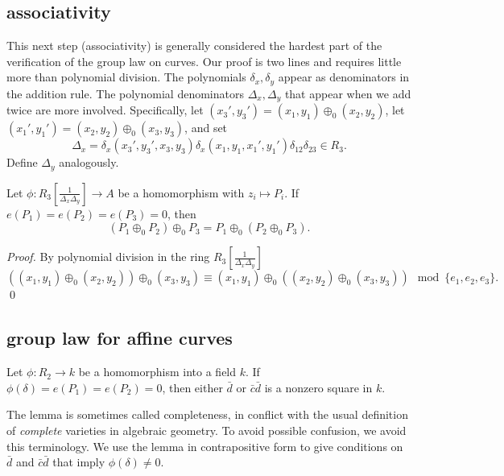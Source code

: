 \documentclass{llncs}
\newcommand{\f}[1]{\frac{1}{#1}}
\begin{document}
\subsection{associativity}\label{sec:assoc}

This next step (associativity) is generally considered the hardest
part of the verification of the group law on curves.  Our proof is two
lines and requires little more than polynomial division.  The
polynomials $\delta_x,\delta_y$ appear as denominators in the addition
rule.  The polynomial denominators $\Delta_x,\Delta_y$ that appear
when we add twice are more involved.  Specifically, let $
(x_3',y_3')=(x_1,y_1) \oplus_0 (x_2,y_2)$, let $(x_1',y_1')=(x_2,y_2)
\oplus_0 (x_3,y_3) $, and set
\[
\Delta_x = \delta_x(x_3',y_3',x_3,y_3)
\delta_x(x_1,y_1,x_1',y_1')\delta_{12}\delta_{23}\in R_3.
\]
Define $\Delta_y$ analogously.

\begin{lemma} \label{lemma:assoc} Let
  $\phi:R_3[\f{\Delta_x\Delta_y}]\to A$ be a homomorphism with
  $z_i\mapsto P_i$.  If $e(P_1)=e(P_2)=e(P_3)=0$, then
\[
(P_1 \oplus_0 P_2)\oplus_0 P_3 = 
P_1 \oplus_0 (P_2\oplus_0 P_3).
\]
\end{lemma}

\begin{proof} By polynomial division in the
  ring $R_3[\f{\Delta_x\Delta_y}]$
\[
((x_1,y_1)\oplus_0 (x_2,y_2)) \oplus_0 (x_3,y_3)\equiv
(x_1,y_1)\oplus_0 ((x_2,y_2) \oplus_0 (x_3,y_3)) \mod \{e_1,e_2,e_3\}.
\]
\qed\end{proof}

\subsection{group law for affine curves}

\begin{lemma} \label{lemma:affine} Let $\phi:R_2\to k$
  be a homomorphism into a field $k$.  If
  $\phi(\delta)=e(P_1)=e(P_2)=0$, then either $\bar d$ or $\bar c \bar
  d$ is a nonzero square in $k$.
\end{lemma}

The lemma is sometimes called completeness, in conflict with the usual
definition of \emph{complete} varieties in algebraic geometry.  To
avoid possible confusion, we avoid this terminology.  We use the lemma
in contrapositive form to give conditions on $\bar d$ and $\bar c\bar
d$ that imply $\phi(\delta)\ne0$.
\end{document}
